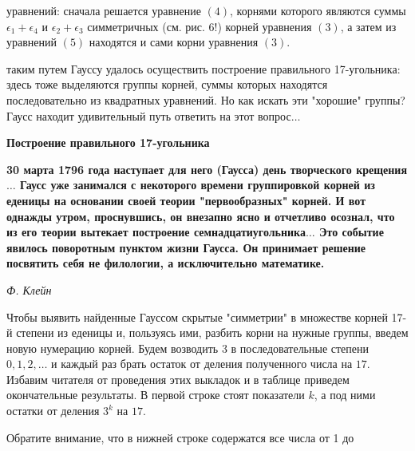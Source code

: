 \pagestyle{empty}
\begin{minipage}{0.45\textwidth}
уравнений: сначала решается уравнение $(4)$, корнями которого являются суммы $\epsilon_1 + \epsilon_4$ и $\epsilon_2 + \epsilon_3$ симметричных (см. рис. 6!) корней уравнения $(3)$, а затем из уравнений $(5)$ находятся и сами корни уравнения $(3)$.


 таким путем Гауссу удалось осуществить построение правильного 17-угольника: здесь тоже выделяются группы корней, суммы которых находятся последовательно из квадратных уравнений. Но как искать эти "хорошие" группы? Гаусс находит удивительный путь ответить на этот вопрос$\ldots$
\begin{center}
\textbf{Построение правильного 17-угольника}
\end{center}
\begin{flushright}
\begin{minipage}{.9\textwidth}
\begin{spacing}{.7}
\par\footnotesize{\textbf{30 марта 1796 года наступает для него (Гаусса) день творческого крещения$\ldots$ Гаусс уже занимался с некоторого времени группировкой корней из еденицы на основании своей теории "первообразных" корней. И вот однажды утром, проснувшись, он внезапно ясно и отчетливо осознал, что из его теории вытекает построение семнадцатиугольника$\ldots$ Это событие явилось поворотным пунктом жизни Гаусса. Он принимает решение посвятить себя не филологии, а исключительно математике.}}
\begin{flushright}
\footnotesize{\it{Ф. Клейн}}
\end{flushright}
\end{spacing}
\end{minipage}
\end{flushright}
Чтобы выявить найденные Гауссом скрытые "симметрии" в множестве корней 17-й степени из еденицы и, пользуясь ими, разбить корни на нужные группы, введем новую нумерацию корней. Будем возводить 3 в последовательные степени $0, 1, 2, \ldots$ и каждый раз брать остаток от деления полученного числа на $17$. Избавим читателя от проведения этих выкладок и в таблице приведем окончательные результаты. В первой строке стоят показатели $k$, а под ними остатки от деления $3^k$ на $17$.


Обратите внимание, что в нижней строке содержатся все числа от 1 до
\end{minipage}
\hfill
